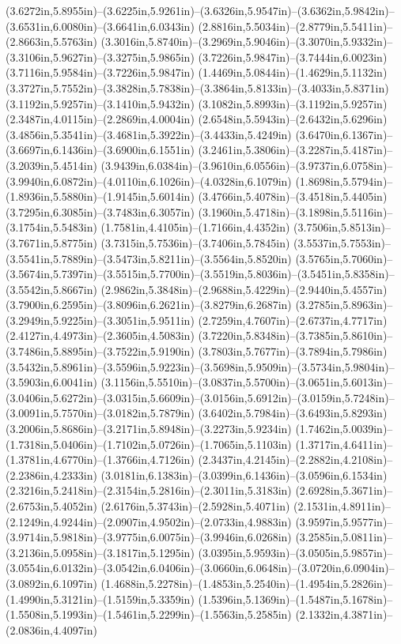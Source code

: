 (3.6272in,5.8955in)--(3.6225in,5.9261in)--(3.6326in,5.9547in)--(3.6362in,5.9842in)--(3.6531in,6.0080in)--(3.6641in,6.0343in) (2.8816in,5.5034in)--(2.8779in,5.5411in)--(2.8663in,5.5763in) (3.3016in,5.8740in)--(3.2969in,5.9046in)--(3.3070in,5.9332in)--(3.3106in,5.9627in)--(3.3275in,5.9865in) (3.7226in,5.9847in)--(3.7444in,6.0023in) (3.7116in,5.9584in)--(3.7226in,5.9847in) (1.4469in,5.0844in)--(1.4629in,5.1132in) (3.3727in,5.7552in)--(3.3828in,5.7838in)--(3.3864in,5.8133in)--(3.4033in,5.8371in) (3.1192in,5.9257in)--(3.1410in,5.9432in) (3.1082in,5.8993in)--(3.1192in,5.9257in) (2.3487in,4.0115in)--(2.2869in,4.0004in) (2.6548in,5.5943in)--(2.6432in,5.6296in) (3.4856in,5.3541in)--(3.4681in,5.3922in)--(3.4433in,5.4249in) (3.6470in,6.1367in)--(3.6697in,6.1436in)--(3.6900in,6.1551in) (3.2461in,5.3806in)--(3.2287in,5.4187in)--(3.2039in,5.4514in) (3.9439in,6.0384in)--(3.9610in,6.0556in)--(3.9737in,6.0758in)--(3.9940in,6.0872in)--(4.0110in,6.1026in)--(4.0328in,6.1079in) (1.8698in,5.5794in)--(1.8936in,5.5880in)--(1.9145in,5.6014in) (3.4766in,5.4078in)--(3.4518in,5.4405in) (3.7295in,6.3085in)--(3.7483in,6.3057in) (3.1960in,5.4718in)--(3.1898in,5.5116in)--(3.1754in,5.5483in) (1.7581in,4.4105in)--(1.7166in,4.4352in) (3.7506in,5.8513in)--(3.7671in,5.8775in) (3.7315in,5.7536in)--(3.7406in,5.7845in) (3.5537in,5.7553in)--(3.5541in,5.7889in)--(3.5473in,5.8211in)--(3.5564in,5.8520in) (3.5765in,5.7060in)--(3.5674in,5.7397in)--(3.5515in,5.7700in)--(3.5519in,5.8036in)--(3.5451in,5.8358in)--(3.5542in,5.8667in) (2.9862in,5.3848in)--(2.9688in,5.4229in)--(2.9440in,5.4557in) (3.7900in,6.2595in)--(3.8096in,6.2621in)--(3.8279in,6.2687in) (3.2785in,5.8963in)--(3.2949in,5.9225in)--(3.3051in,5.9511in) (2.7259in,4.7607in)--(2.6737in,4.7717in) (2.4127in,4.4973in)--(2.3605in,4.5083in) (3.7220in,5.8348in)--(3.7385in,5.8610in)--(3.7486in,5.8895in)--(3.7522in,5.9190in) (3.7803in,5.7677in)--(3.7894in,5.7986in) (3.5432in,5.8961in)--(3.5596in,5.9223in)--(3.5698in,5.9509in)--(3.5734in,5.9804in)--(3.5903in,6.0041in) (3.1156in,5.5510in)--(3.0837in,5.5700in)--(3.0651in,5.6013in)--(3.0406in,5.6272in)--(3.0315in,5.6609in)--(3.0156in,5.6912in)--(3.0159in,5.7248in)--(3.0091in,5.7570in)--(3.0182in,5.7879in) (3.6402in,5.7984in)--(3.6493in,5.8293in) (3.2006in,5.8686in)--(3.2171in,5.8948in)--(3.2273in,5.9234in) (1.7462in,5.0039in)--(1.7318in,5.0406in)--(1.7102in,5.0726in)--(1.7065in,5.1103in) (1.3717in,4.6411in)--(1.3781in,4.6770in)--(1.3766in,4.7126in) (2.3437in,4.2145in)--(2.2882in,4.2108in)--(2.2386in,4.2333in) (3.0181in,6.1383in)--(3.0399in,6.1436in)--(3.0596in,6.1534in) (2.3216in,5.2418in)--(2.3154in,5.2816in)--(2.3011in,5.3183in) (2.6928in,5.3671in)--(2.6753in,5.4052in) (2.6176in,5.3743in)--(2.5928in,5.4071in) (2.1531in,4.8911in)--(2.1249in,4.9244in)--(2.0907in,4.9502in)--(2.0733in,4.9883in) (3.9597in,5.9577in)--(3.9714in,5.9818in)--(3.9775in,6.0075in)--(3.9946in,6.0268in) (3.2585in,5.0811in)--(3.2136in,5.0958in)--(3.1817in,5.1295in) (3.0395in,5.9593in)--(3.0505in,5.9857in)--(3.0554in,6.0132in)--(3.0542in,6.0406in)--(3.0660in,6.0648in)--(3.0720in,6.0904in)--(3.0892in,6.1097in) (1.4688in,5.2278in)--(1.4853in,5.2540in)--(1.4954in,5.2826in)--(1.4990in,5.3121in)--(1.5159in,5.3359in) (1.5396in,5.1369in)--(1.5487in,5.1678in)--(1.5508in,5.1993in)--(1.5461in,5.2299in)--(1.5563in,5.2585in) (2.1332in,4.3871in)--(2.0836in,4.4097in) 